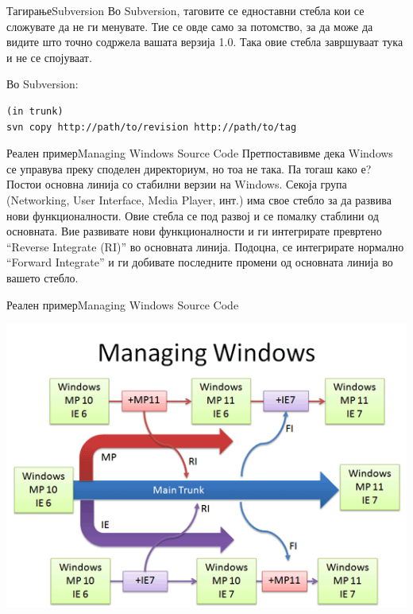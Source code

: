 \begin{frame}[fragile]{Тагирање}{Subversion}
Во Subversion, таговите се едноставни стебла кои се сложувате да не ги
менувате. Тие се овде само за потомство, за да може да видите што точно
содржела вашата верзија 1.0. Така овие стебла завршуваат тука и не се спојуваат.
\begin{exampleblock}{Во Subversion:}
\begin{verbatim}
(in trunk)
svn copy http://path/to/revision http://path/to/tag
\end{verbatim}
\end{exampleblock}
\end{frame}

\begin{frame}{Реален пример}{Managing Windows Source Code}
Претпоставивме дека Windows се управува преку споделен директориум, но тоа не
така. Па тогаш како е?\\
Постои основна линија со стабилни верзии на Windows. Секоја група (Networking,
User Interface, Media Player, инт.) има свое стебло за да развива нови
функционалности. Овие стебла се под развој и се помалку стаблини од основната.
Вие развивате нови функционалности и ги интегрирате превртено “Reverse Integrate
(RI)” во основната линија. Подоцна, се интегрирате нормално “Forward Integrate”
и ги добивате последните промени од основната линија во вашето стебло.
\end{frame}

\begin{frame}{Реален пример}{Managing Windows Source Code}
\begin{center}
    \includegraphics[scale=0.4]{images/windows.png}
\end{center}
\end{frame}

